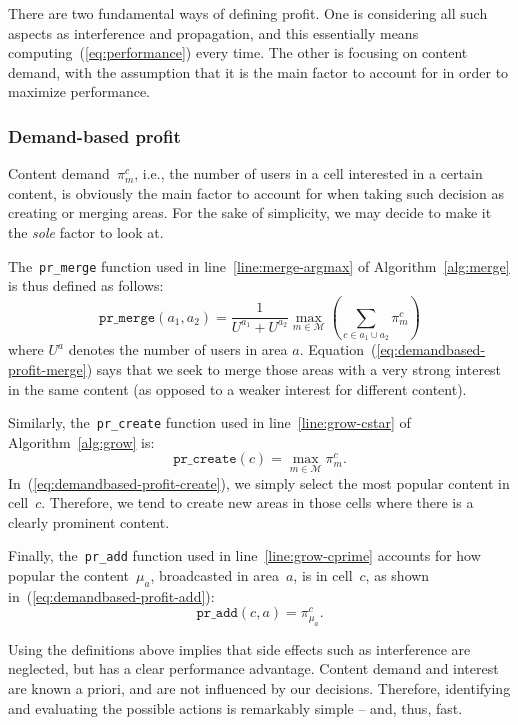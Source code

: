 \documentclass[10pt, conference, compsocconf]{IEEEtran}
\newcommand{\Mc}{\mathcal{M}}
\numberwithin{equation}{section}
\begin{document}
There are two fundamental ways of defining profit. One is considering all such aspects as
interference and propagation, and this essentially means computing~(\ref{eq:performance}) every time.
The other is focusing on content demand, with the assumption that it is the main
factor to account for in order to maximize performance.

\subsubsection{Demand-based profit}

Content demand~$\pi^c_m$, i.e., the number of users in a cell interested
in a certain content, is obviously
the main factor to account for when taking such decision as creating or merging areas. For
the sake of simplicity, we may decide to make it the {\em sole} factor to look at.

The~\texttt{pr\_merge} function used in line~\ref{line:merge-argmax} of Algorithm~\ref{alg:merge}
is thus defined as follows:
\begin{equation}
\label{eq:demandbased-profit-merge}
\texttt{pr\_merge}(a_1,a_2)=\frac{1}{U^{a_1}+U^{a_2}}\max_{m\in\Mc}\left(\sum_{c\in a_1\cup a_2}\pi_m^c\right)
\end{equation}
where $U^{a}$ denotes the number of users in area $a$. 
Equation~(\ref{eq:demandbased-profit-merge}) says that we seek to merge those areas with a very
strong interest in the same content (as opposed to a weaker interest for different
content).

Similarly, the~\texttt{pr\_create} function used in line~\ref{line:grow-cstar} of
Algorithm~\ref{alg:grow} is:
\begin{equation}
\label{eq:demandbased-profit-create}
\texttt{pr\_create}(c)=\max_{m\in\Mc}\pi_m^c.
\end{equation}
In~(\ref{eq:demandbased-profit-create}), we simply select the most popular content in cell~$c$.
Therefore, we tend to create new areas in those cells where there is a clearly prominent
content.

Finally, the~\texttt{pr\_add} function used in line~\ref{line:grow-cprime} accounts for
how popular the content~$\mu_a$, broadcasted in area~$a$, is in cell~$c$, as shown
in~(\ref{eq:demandbased-profit-add}):
\begin{equation}
\label{eq:demandbased-profit-add}
\texttt{pr\_add}(c,a)=\pi_{\mu_a}^c.
\end{equation}

Using the definitions above implies that side effects such as
interference are neglected, but has a
clear performance advantage. Content demand and interest are known a priori, and are not
influenced by our decisions. Therefore, identifying and evaluating the possible actions
is remarkably simple -- and, thus, fast.
\end{document}
